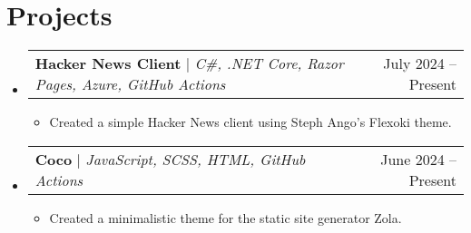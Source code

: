 \documentclass[letterpaper,11pt]{article}
\makeatletter
\newcommand{\resumeItem}[1]{
  \item\small{#1}
}
\newcommand{\resumeSubheading}[4]{
  \vspace{-2pt}\item
    \begin{tabular*}{0.97\textwidth}[t]{l@{\extracolsep{\fill}}r}
      \textbf{#1} & #2 \\
      \textit{\small#3} & \textit{\small #4} \\
    \end{tabular*}\vspace{-7pt}
}
\newcommand{\resumeSimpleSubheading}[2]{
  \vspace{-2pt}\item
    \begin{tabular*}{0.97\textwidth}[t]{l@{\extracolsep{\fill}}r}
      \small\textbf{#1} & #2 \\
    \end{tabular*}\vspace{-7pt}
}
\newcommand{\resumeProjectHeading}[2]{
    \item
    \begin{tabular*}{0.97\textwidth}{l@{\extracolsep{\fill}}r}
      \small#1 & #2 \\
    \end{tabular*}\vspace{-7pt}
}
\newcommand{\resumeSubHeadingListStart}{\begin{itemize}[leftmargin=0.15in, label={}]}
\newcommand{\resumeSubHeadingListEnd}{\end{itemize}}
\newcommand{\resumeItemListStart}{\begin{itemize}}
\newcommand{\resumeItemListEnd}{\end{itemize}}
\makeatother
\begin{document}
\section{Projects}
    \resumeSubHeadingListStart
      \resumeProjectHeading
          {\textbf{Hacker News Client} $|$ \emph{C\#, .NET Core, Razor Pages, Azure, GitHub Actions}}{July 2024 -- Present}
          \resumeItemListStart
            \resumeItem{Created a simple Hacker News client using Steph Ango's Flexoki theme.}
          \resumeItemListEnd
      \resumeProjectHeading
          {\textbf{Coco} $|$ \emph{JavaScript, SCSS, HTML, GitHub Actions}}{June 2024 -- Present}
          \resumeItemListStart
            \resumeItem{Created a minimalistic theme for the static site generator Zola.}
          \resumeItemListEnd
    \resumeSubHeadingListEnd



\end{document}
